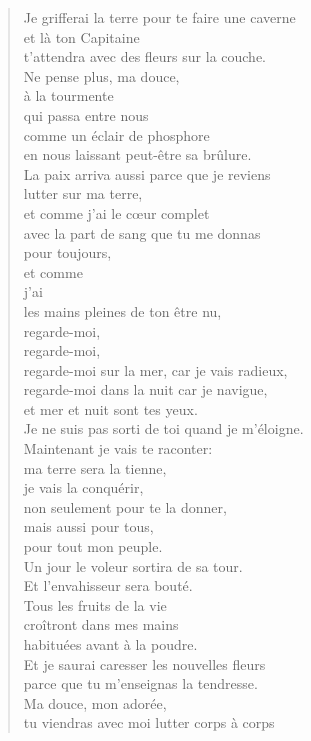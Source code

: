 \documentclass[11pt,a4paper]{book}
\begin{document}
\begin{verse}
Je grifferai la terre pour te faire une caverne \\
et là ton Capitaine \\
t'attendra avec des fleurs sur la couche. \\
Ne pense plus, ma douce, \\
à la tourmente \\
qui passa entre nous \\
comme un éclair de phosphore \\
en nous laissant peut-être sa brûlure. \\
La paix arriva aussi parce que je reviens \\
lutter sur ma terre, \\
et comme j'ai le c{\oe}ur complet \\
avec la part de sang que tu me donnas \\
pour toujours, \\
et comme \\
j'ai \\
les mains pleines de ton être nu, \\
regarde-moi, \\
regarde-moi, \\
regarde-moi sur la mer, car je vais radieux, \\
regarde-moi dans la nuit car je navigue, \\
et mer et nuit sont tes yeux. \\
Je ne suis pas sorti de toi quand je m'éloigne. \\
Maintenant je vais te raconter: \\
ma terre sera la tienne, \\
je vais la conquérir, \\
non seulement pour te la donner, \\
mais aussi pour tous, \\
pour tout mon peuple. \\
Un jour le voleur sortira de sa tour. \\
Et l'envahisseur sera bouté. \\
Tous les fruits de la vie \\
croîtront dans mes mains \\
habituées avant à la poudre. \\
Et je saurai caresser les nouvelles fleurs \\
parce que tu m'enseignas la tendresse. \\
Ma douce, mon adorée, \\
tu viendras avec moi lutter corps à corps \\

\end{verse}
\end{document}
